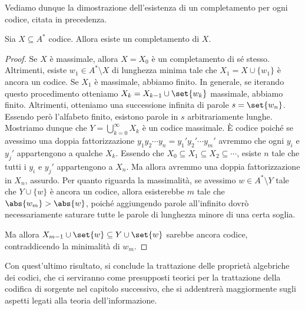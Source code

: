 Vediamo dunque la dimostrazione dell'esistenza di un completamento per ogni codice, citata in precedenza.
\begin{proposition}{}
  Sia \(X \subseteq A^*\) codice. Allora esiste un completamento di \(X\).
\end{proposition}
\begin{proof}
  Se \(X\) è massimale, allora \(X = X_0\) è un completamento di sé stesso.
  Altrimenti, esiste \(w_1 \in A^*\setminus X\) di lunghezza minima tale che \(X_1 = X \cup \{w_1\}\) è ancora un codice.
  Se \(X_1\) è massimale, abbiamo finito.
  In generale, se iterando questo procedimento otteniamo \(X_k = X_{k-1} \cup \set{w_k}\) massimale, abbiamo finito.
  Altrimenti, otteniamo una successione infinita di parole \(s = \set{w_n}\). Essendo però l'alfabeto finito, esistono parole in \(s\) arbitrariamente lunghe.
  Mostriamo dunque che \(Y = \bigcup_{k = 0}^{\infty} X_k\) è un codice massimale.
  È codice poiché se avessimo una doppia fattorizzazione \(y_1 y_2 \cdots y_n = y_1' y_2' \cdots y_m'\) avremmo che ogni \(y_i\) e \(y_j'\) appartengono a qualche \(X_k\). Essendo che \(X_0 \subseteq X_1 \subseteq X_2 \subseteq \cdots\), esiste \(n\) tale che tutti i \(y_i\) e \(y_j'\) appartengono a \(X_n\). Ma allora avremmo una doppia fattorizzazione in \(X_n\), assurdo.
  Per quanto riguarda la massimalità, se avessimo \(w \in A^* \setminus Y\) tale che \(Y \cup \{w\}\) è ancora un codice, allora esisterebbe \(m\) tale che \(\abs{w_m} > \abs{w}\), poiché aggiungendo parole all'infinito dovrò necessariamente saturare tutte le parole di lunghezza minore di una certa soglia.
  
  Ma allora \(X_{m-1} \cup \set{w}\subseteq Y \cup \set{w}\) sarebbe ancora codice, contraddicendo la minimalità di \(w_m\).
\end{proof}

Con quest'ultimo risultato, si conclude la trattazione delle proprietà algebriche dei codici, che ci serviranno come presupposti teorici per la trattazione della codifica di sorgente nel capitolo successivo, che si addentrerà maggiormente sugli aspetti legati alla teoria dell'informazione.